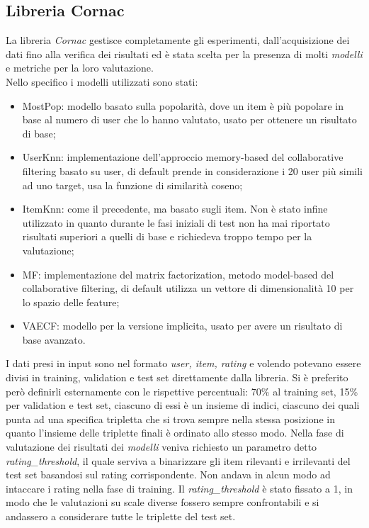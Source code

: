 \subsection{Libreria Cornac}
La libreria \textit{Cornac} gestisce completamente gli esperimenti, dall'acquisizione dei dati fino alla verifica dei risultati ed è stata scelta per la presenza di molti \textit{modelli} e metriche per la loro valutazione.\\
Nello specifico i modelli utilizzati sono stati:
\begin{itemize}
    \item MostPop: modello basato sulla popolarità, dove un item è più popolare in base al numero di user che lo hanno valutato, usato per ottenere un risultato di base;
    \item UserKnn: implementazione dell'approccio memory-based del collaborative filtering basato su user, di default prende in considerazione i 20 user più simili ad uno target, usa la funzione di similarità coseno;
    \item ItemKnn: come il precedente, ma basato sugli item. Non è stato infine utilizzato in quanto durante le fasi iniziali di test non ha mai riportato risultati superiori a quelli di base e richiedeva troppo tempo per la valutazione;
    \item MF: implementazione del matrix factorization, metodo model-based del collaborative filtering, di default utilizza un vettore di dimensionalità 10 per lo spazio delle feature;
    \item VAECF: modello per la versione implicita, usato per avere un risultato di base avanzato.
\end{itemize}
I dati presi in input sono nel formato \textit{user, item, rating} e volendo potevano essere divisi in training, validation e test set direttamente dalla libreria.
Si è preferito però definirli esternamente con le rispettive percentuali: 70\% al training set, 15\% per validation e test set, ciascuno di essi è un insieme di indici, ciascuno dei quali punta ad una specifica tripletta che si trova sempre nella stessa posizione in quanto l'insieme delle triplette finali è ordinato allo stesso modo.
Nella fase di valutazione dei risultati dei \textit{modelli} veniva richiesto un parametro detto \textit{rating\_threshold}, il quale serviva a binarizzare gli item rilevanti e irrilevanti del test set basandosi sul rating corrispondente. Non andava in alcun modo ad intaccare i rating nella fase di training. Il \textit{rating\_threshold} è stato fissato a 1, in modo che le valutazioni su scale diverse fossero sempre confrontabili e si andassero a considerare tutte le triplette del test set.
 
